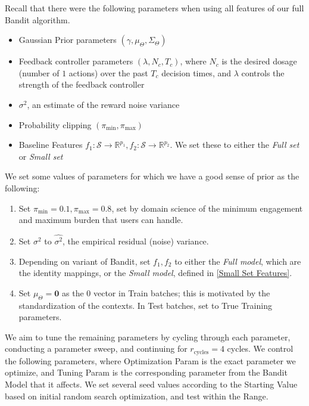 Recall that there were the following parameters when using all features of our full Bandit algorithm.

\begin{itemize}
	\item Gaussian Prior parameters $(\gamma, \mu_\Theta, \Sigma_\Theta)$
	\item Feedback controller parameters $(\lambda, N_c, T_c)$, where $N_c$ is the desired dosage (number of $1$ actions) over the past $T_c$ decision times, and $\lambda$ controls the strength of the feedback controller
	\item $\sigma^2$, an estimate of the reward noise variance
	\item Probability clipping $(\pi_{\text{min}}, \pi_{\text{max}})$ 
	\item Baseline Features $f_1: \mathcal{S} \to \mathbb{R}^{p_1}, f_2:\mathcal{S} \to \mathbb{R}^{p_2}$.  We set these to either the {\it Full set} or {\it Small set}
\end{itemize}

\noindent We set some values of parameters for which we have a good sense of prior as the following:

\begin{enumerate}
	\item Set $\pi_{\text{min}} = 0.1, \pi_{\text{max}} = 0.8$, set by domain science of the minimum engagement and maximum burden that users can handle.
	\item Set $\sigma^2$ to $\hat{\sigma^2}$, the empirical residual (noise) variance.
	\item Depending on variant of Bandit, set $f_1, f_2$ to either the {\it Full model}, which are the identity mappings, or the {\it Small model}, defined in \ref{Small Set Features}.
	\item Set $\mu_\Theta = \boldsymbol{0}$ as the $0$ vector in Train batches; this is motivated by the standardization of the contexts. In Test batches, set to True Training parameters.
\end{enumerate}

We aim to tune the remaining parameters by cycling through each parameter, conducting a parameter sweep, and continuing for $r_{\text{cycles}} = 4$ cycles.  We control the following parameters, where Optimization Param is the exact parameter we optimize, and Tuning Param is the corresponding parameter from the Bandit Model that it affects.  We set several seed values according to the Starting Value based on initial random search optimization, and test within the Range.


